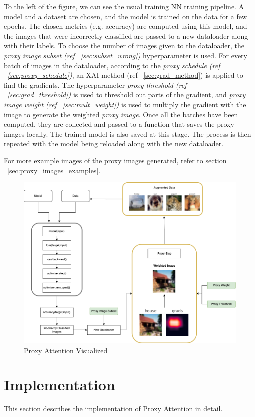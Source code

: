\documentclass[a4paper,11pt,openright]{book}
\begin{document}
To the left of the figure, we can see the usual training NN training pipeline. A model and a dataset are chosen, and the model is trained on the data for a few epochs. The chosen metrics (e.g. accuracy) are computed using this model, and the images that were incorrectly classified are passed to a new dataloader along with their labels. To choose the number of images given to the dataloader, the \textit{proxy image subset (ref ~\ref{sec:subset_wrong})} hyperparameter is used. For every batch of images in the dataloader, according to the \textit{proxy schedule (ref ~\ref{sec:proxy_schedule})}, an XAI method (ref ~\ref{sec:grad_method}) is applied to find the gradients. The hyperparameter \textit{proxy threshold (ref ~\ref{sec:grad_threshold})} is used to threshold out parts of the gradient, and \textit{proxy image weight (ref ~\ref{sec:mult_weight})} is used to multiply the gradient with the image to generate the weighted \textit{proxy image}. Once all the batches have been computed, they are collected and passed to a function that saves the proxy images locally. The trained model is also saved at this stage. The process is then repeated with the model being reloaded along with the new dataloader.

For more example images of the proxy images generated, refer to section ~\ref{sec:proxy_images_examples}.

\begin{figure}[!htb]
    \centering
    \includegraphics[width=.8\textwidth]{images/proxy_flow.png}
    \caption{Proxy Attention Visualized}
    \label{fig:proxy_flow}
\end{figure}

\section{Implementation}
This section describes the implementation of Proxy Attention in detail. 
\end{document}
